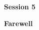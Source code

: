 \vspace{1ex}
\item[] {\bfseries Session 5}
\item[$\bullet$] 
\item[$\bullet$] 

\vspace{1ex}
\item[5:30--5:33] {\bfseries  Farewell}
